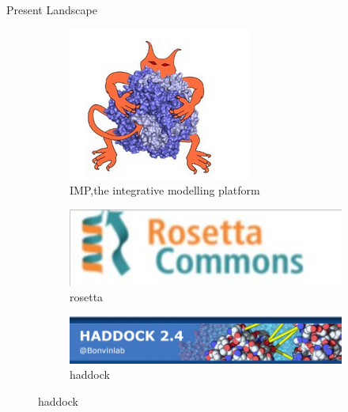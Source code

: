 \begin{frame}{Present Landscape}
    \begin{figure}[h]
        \centering
        \begin{subfigure}[b]{0.3\textwidth}
            \centering
            \includegraphics[width=\textwidth]{images/monster.png}
            \caption{IMP,the integrative modelling platform}
            \label{fig:image1}
        \end{subfigure}
        \hfill
        \begin{subfigure}[b]{0.3\textwidth}
            \centering
            \includegraphics[width=\textwidth]{images/rosseta.png}
            \caption{rosetta}
            \label{fig:image2}
        \end{subfigure}
        \hfill
        \begin{subfigure}[b]{0.7\textwidth}
            \centering
            \includegraphics[width=\textwidth]{images/haddock.png}
            \caption{haddock}
            \label{fig:image2}
        \end{subfigure}
    \end{figure}

    
\end{frame}

